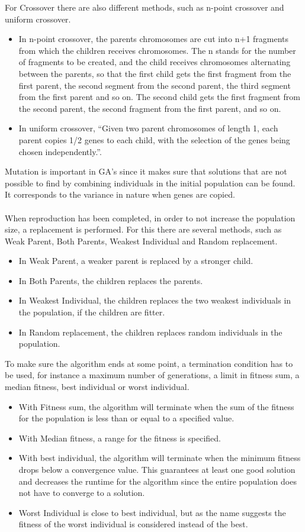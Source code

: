 For Crossover there are also different methods, such as n-point crossover and uniform crossover.
\begin{itemize}
\item In n-point crossover, the parents chromosomes are cut into n+1 fragments from which the children receives chromosomes. The n stands for the number of fragments to be created, and the child receives chromosomes alternating between the parents, so that the first child gets the first fragment from the first parent, the second segment from the second parent, the third segment from the first parent and so on. The second child gets the first fragment from the second parent, the second fragment from the first parent, and so on.
\item In uniform crossover, ``Given two parent chromosomes of length 1, each parent copies 1/2 genes to each child, with the selection of the genes being chosen independently.''\cite{GAHandbook1}.
\end{itemize}
Mutation is important in GA's since it makes sure that solutions that are not possible to find by combining individuals in the initial population can be found. It corresponds to the variance in nature when genes are copied.\\\\ %
When reproduction has been completed, in order to not increase the population size, a replacement is performed. For this there are several methods, such as Weak Parent, Both Parents, Weakest Individual and Random replacement.
\begin{itemize}
\item In Weak Parent, a weaker parent is replaced by a stronger child.
\item In Both Parents, the children replaces the parents.
\item In Weakest Individual, the children replaces the two weakest individuals in the population, if the children are fitter.
\item In Random replacement, the children replaces random individuals in the population.
\end{itemize}
To make sure the algorithm ends at some point, a termination condition has to be used, for instance a maximum number of generations, a limit in fitness sum, a median fitness, best individual or worst individual.
\begin{itemize}
\item With Fitness sum, the algorithm will terminate when the sum of the fitness for the population is less than or equal to a specified value.
\item With Median fitness, a range for the fitness is specified.
\item With best individual, the algorithm will terminate when the minimum fitness drops below a convergence value. This guarantees at least one good solution and decreases the runtime for the algorithm since the entire population does not have to converge to a solution.
\item Worst Individual is close to best individual, but as the name suggests the fitness of the worst individual is  considered instead of the best.
\end{itemize}

